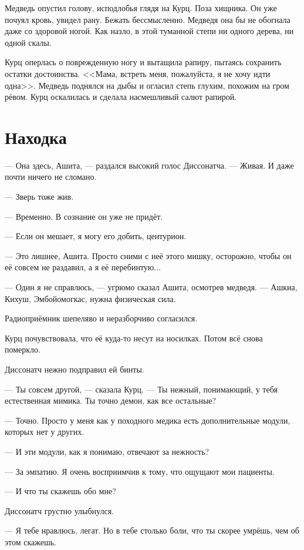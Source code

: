 Медведь опустил голову, исподлобья глядя на Курц.
Поза хищника.
Он уже почуял кровь, увидел рану.
Бежать бессмысленно.
Медведя она бы не обогнала даже со здоровой ногой.
Как назло, в этой туманной степи ни одного дерева, ни одной скалы.

Курц оперлась о поврежденную ногу и вытащила рапиру, пытаясь сохранить остатки достоинства.
<<Мама, встреть меня, пожалуйста, я не хочу идти одна>>.
Медведь поднялся на дыбы и огласил степь глухим, похожим на гром рёвом.
Курц оскалилась и сделала насмешливый салют рапирой.

\section{Находка}

--- Она здесь, Ашита, --- раздался высокий голос Диссонатча.
--- Живая.
И даже почти ничего не сломано.

--- Зверь тоже жив.

--- Временно.
В сознание он уже не придёт.

--- Если он мешает, я могу его добить, центурион.

--- Это лишнее, Ашита.
Просто сними с неё этого мишку, осторожно, чтобы он её совсем не раздавил, а я её перебинтую...

--- Один я не справлюсь, --- угрюмо сказал Ашита, осмотрев медведя.
--- Ашкиа, Кихуш, Эмбойомогкас, нужна физическая сила. %

Радиоприёмник шепеляво и неразборчиво согласился.

Курц почувствовала, что её куда-то несут на носилках.
Потом всё снова померкло.

\asterism

Диссонатч нежно подправил ей бинты.

--- Ты совсем другой, --- сказала Курц.
--- Ты нежный, понимающий, у тебя естественная мимика.
Ты точно демон, как все остальные?

--- Точно.
Просто у меня как у походного медика есть дополнительные модули, которых нет у других.

--- И эти модули, как я понимаю, отвечают за нежность?

--- За эмпатию.
Я очень восприимчив к тому, что ощущают мои пациенты.

--- И что ты скажешь обо мне?

Диссонатч грустно улыбнулся.

--- Я тебе нравлюсь, легат.
Но в тебе столько боли, что ты скорее умрёшь, чем об этом скажешь.

